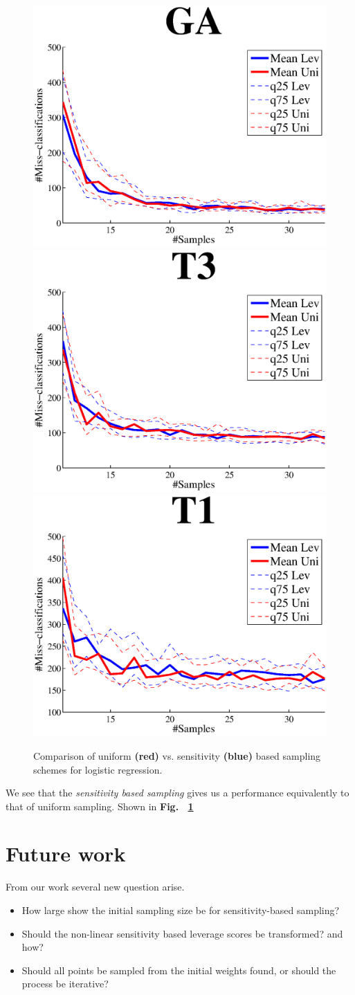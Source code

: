 \documentclass{article}
\begin{document}
\begin{figure}[t]
\centering
\includegraphics[width=.49\linewidth]{images/GAsen.eps}
\includegraphics[width=.49\linewidth]{images/T3sen.eps}
\includegraphics[width=.49\linewidth]{images/T1sen.eps}
\caption{Comparison of uniform {\bf\color{red}(red)} vs. sensitivity {\bf\color{blue}(blue)} based sampling schemes for logistic regression.}
\label{fig:SENS_class}
\end{figure}	

We see that the \emph{sensitivity based sampling} gives us a performance  equivalently to that of uniform sampling. Shown in {\bf Fig.~ \ref{fig:SENS_class}}
%
\section{Future work}
From our work several new question arise.
\begin{itemize}
\item How large show the initial sampling size be for sensitivity-based sampling?
\item Should the non-linear sensitivity based leverage scores be transformed? and how?
\item Should all points be sampled from the initial weights found, or should the process be iterative?
\end{itemize}
%
\end{document}

